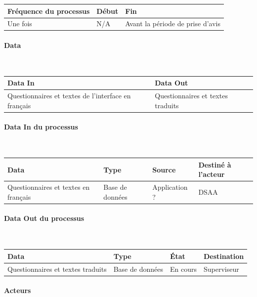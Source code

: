 \documentclass[a4paper,11pt]{report}
\begin{document}
\begin{tabularx}{\linewidth}{|X|X|X|} \hline
Fréquence du processus & Début & Fin \\ \hline
Une fois & N/A & Avant la période de prise d'avis \\ \hline
\end{tabularx}

\paragraph{Data}~\newline{}

\begin{tabularx}{\linewidth}{|X|X|} \hline
Data In & Data Out \\ \hline
Questionnaires et textes de l'interface en français & Questionnaires et textes traduits\\ \hline
\end{tabularx}

\paragraph{Data In du processus}~\newline{}

\begin{tabularx}{\linewidth}{|X|X|X|X|} \hline
Data & Type & Source & Destiné à l'acteur \\ \hline
Questionnaires et textes en français & Base de données & Application ? & DSAA\\ \hline
\end{tabularx}

\paragraph{Data Out du processus}~\newline{}

\begin{tabularx}{\linewidth}{|X|X|X|X|} \hline
Data & Type & État & Destination \\ \hline
Questionnaires et textes traduits & Base de données & En cours & Superviseur \\ \hline
\end{tabularx}

\paragraph{Acteurs}~\newline{}
\end{document}
